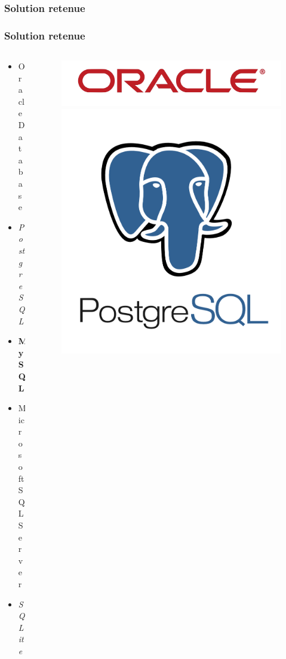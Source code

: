 \subsubsection[Solution retenue]{Solution retenue}
\begin{frame}
\frametitle{Solution retenue}
\begin{columns}
\begin{column}{5cm}
\begin{itemize}
	\item Oracle Database
	\item \textit{PostgreSQL}
	\item \textbf{MySQL}
	\item Microsoft SQL Server
	\item \textit{SQLite}
\end{itemize}
\end{column}
\begin{column}{7cm}
\begin{figure}
\includegraphics[scale=0.038]{Images/Oracle}
\includegraphics[scale=0.18]{Images/PostgreSQL}\\

\end{figure}
\end{column}
\end{columns}
\end{frame}
